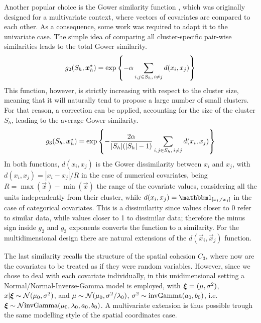 \documentclass[12pt,	%
	a4paper,		%
	twoside,		%
	openright,		%
	titlepage,%
	]{book}
\theoremstyle{definition}
\begin{document}
Another popular choice is the Gower similarity function \cite{gower}, which was originally designed for a multivariate context, where vectors of covariates are compared to each other. As a consequence, some work was required to adapt it to the univariate case. The simple idea of comparing all cluster-specific pair-wise similarities leads to the total Gower similarity.
\begin{equation}    
g_2(S_h,\boldsymbol{x}_{h}^\star) = \exp \left\{ -\alpha \sum_{i,j \in S_h, \,i\neq j} d(x_i,x_j)  \right\}
\end{equation}
This function, however, is strictly increasing with respect to the cluster size, meaning that it will naturally tend to propose a large number of small clusters. For that reason, a correction can be applied, accounting for the size of the cluster $S_h$, leading to the average Gower similarity.
\begin{equation}    
g_3(S_h,\boldsymbol{x}_{h}^\star) = \exp \left\{ -\dfrac{2\alpha}{|S_h|(|S_h|-1)} \sum_{i,j \in S_h, \,i\neq j} d(x_i,x_j)  \right\}
\end{equation}
In both functions, $d(x_i,x_j)$ is the Gower dissimilarity between $x_i$ and $x_j$, with $d(x_i,x_j) =  |x_i - x_j|/R$ in the case of numerical covariates, being $R=\max(\vec{x}) - \min(\vec{x})$ the range of the covariate values, considering all the units independently from their cluster, while $d(x_i,x_j) = \indicator{[x_i \neq x_j]}$ in the case of categorical covariates. This is a dissimilarity since values closer to 0 refer to similar data, while values closer to 1 to dissimilar data; therefore the minus sign inside $g_2$ and $g_3$ exponents converts the function to a similarity. For the multidimensional design there are natural extensions of the $d(\vec{x}_i,\vec{x}_j)$ function.

The last similarity recalls the structure of the spatial cohesion $C_3$, where now are the covariates to be treated as if they were random variables. However, since we chose to deal with each covariate individually, in this unidimensional setting a Normal/Normal-Inverse-Gamma model is employed, with $\boldsymbol{\xi} = (\mu,\sigma^2)$, $x|\boldsymbol{\xi} \sim \mathcal{N}(\mu_0,\sigma^2)$, and $\mu \sim \mathcal{N}(\mu_0, \sigma^2/\lambda_0)$, $\sigma^2 \sim \text{invGamma}(a_0,b_0)$, i.e. $\boldsymbol{\xi} \sim \mathcal{N}\text{invGamma}(\mu_0, \lambda_0, a_0, b_0)$. A multivariate extension is thus possible trough the same modelling style of the spatial coordinates case.
\end{document}
